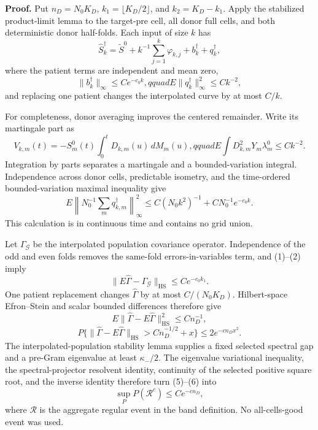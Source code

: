 \textbf{Proof.}
Put \(n_D=N_0K_D\), \(k_1=\lfloor K_D/2\rfloor\), and \(k_2=K_D-k_1\). Apply the stabilized product-limit lemma to the target-pre cell, all donor full cells, and both deterministic donor half-folds. Each input of size \(k\) has
\[
 \widehat S_k^\dagger=\widetilde S^0+k^{-1}\sum_{j=1}^k\varphi_{k,j}
 +b_k^\dagger+q_k^\dagger,                               \tag{1}
\]
where the patient terms are independent and mean zero,
\[
 \|b_k^\dagger\|_\infty\le Ce^{-c_0k},qquad
 E\|q_k^\dagger\|_\infty^2\le Ck^{-2},                  \tag{2}
\]
and replacing one patient changes the interpolated curve by at most \(C/k\).

For completeness, donor averaging improves the centered remainder. Write its martingale part as
\[
 V_{k,m}(t)=-S_m^0(t)\int_0^tD_{k,m}(u)\,dM_m(u),qquad
 E\int D_{k,m}^2Y_m\lambda_m^0\le Ck^{-2}.               \tag{3}
\]
Integration by parts separates a martingale and a bounded-variation integral. Independence across donor cells, predictable isometry, and the time-ordered bounded-variation maximal inequality give
\[
 E\left\|N_0^{-1}\sum_mq_{k,m}^\dagger\right\|_\infty^2
 \le C(N_0k^2)^{-1}+CN_0^{-1}e^{-c_0k}.                  \tag{4}
\]
This calculation is in continuous time and contains no grid union.

Let \(\Gamma_{\mathcal G}\) be the interpolated population covariance operator. Independence of the odd and even folds removes the same-fold errors-in-variables term, and (1)--(2) imply
\[
 \|E\widehat\Gamma-\Gamma_{\mathcal G}\|_{\mathrm{HS}}
 \le Ce^{-c_0k_1}.                                       \tag{5}
\]
One patient replacement changes \(\widehat\Gamma\) by at most \(C/(N_0K_D)\). Hilbert-space Efron--Stein and scalar bounded differences therefore give
\[
 E\|\widehat\Gamma-E\widehat\Gamma\|_{\mathrm{HS}}^2\le Cn_D^{-1},
\]
\[
 P\{\|\widehat\Gamma-E\widehat\Gamma\|_{\mathrm{HS}}
 >Cn_D^{-1/2}+x\}\le2e^{-cn_Dx^2}.                       \tag{6}
\]
The interpolated-population stability lemma supplies a fixed selected spectral gap and a pre-Gram eigenvalue at least \(\kappa_-/2\). The eigenvalue variational inequality, the spectral-projector resolvent identity, continuity of the selected positive square root, and the inverse identity therefore turn (5)--(6) into
\[
 \sup_PP(\mathcal R^c)\le Ce^{-cn_D},                    \tag{7}
\]
where \(\mathcal R\) is the aggregate regular event in the band definition. No all-cells-good event was used.

